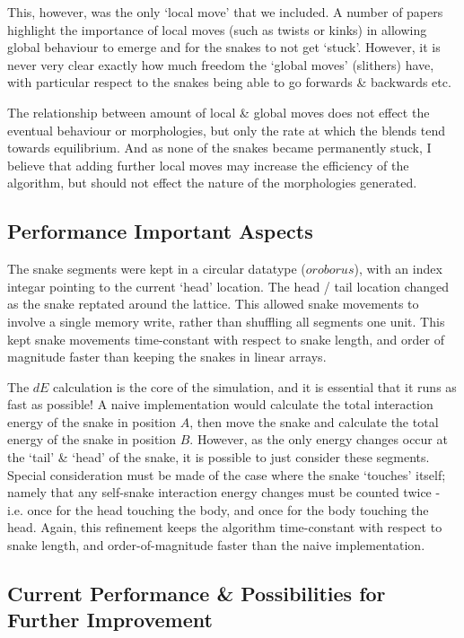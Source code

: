 \documentclass[twocolumn,a4,notitlepage]{report}
\begin{document}
This, however, was the only `local move' that we included. A number of
papers highlight the importance of local moves (such as twists or kinks) in
allowing global behaviour to emerge and for the snakes to not get `stuck'.
However, it is never very clear exactly how much freedom the `global moves'
(slithers) have, with particular respect to the snakes being able to go
forwards \& backwards etc. 

The relationship between amount of local \& global moves does not effect the
eventual behaviour or morphologies, but only the rate at which the blends tend towards
equilibrium. And as none of the snakes became permanently stuck, I believe
that adding further local moves may increase the efficiency of the algorithm, but
should not effect the nature of the morphologies generated.

\subsection{Performance Important Aspects}

The snake segments were kept in a circular datatype ($oroborus$), with an
index integar pointing to the current `head' location. The head / tail
location changed as the snake reptated around the lattice.
This allowed snake
movements to involve a single memory write, rather than shuffling all
segments one unit. This kept snake movements time-constant with respect
to snake length, and order of magnitude faster than keeping the snakes in
linear arrays.

The $dE$ calculation is the core of the simulation, and it is essential that
it runs as fast as possible! A naive implementation would calculate the
total interaction energy of the snake in position $A$, then move the snake
and calculate the total energy of the snake in position $B$. However, as the
only energy changes occur at the `tail' \& `head' of the snake, it is
possible to just consider these segments. Special consideration
must be made of the case where the snake `touches' itself; namely that any
self-snake interaction energy changes must be counted twice - i.e. once for
the head touching the body, and once for the body touching the head. Again,
this refinement keeps the algorithm time-constant with respect to snake
length, and order-of-magnitude faster than the naive implementation.

\subsection{Current Performance \& Possibilities for Further Improvement}
\end{document}
